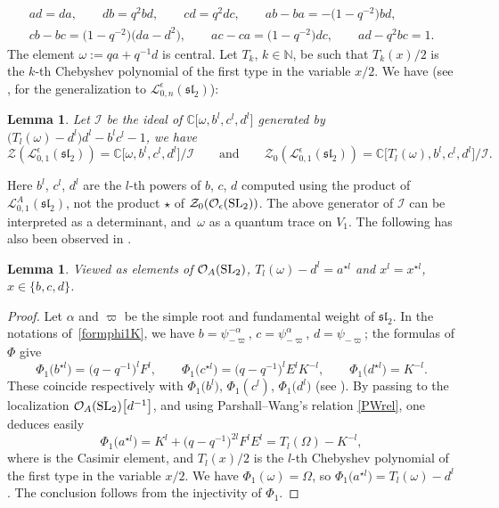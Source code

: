 \documentclass[pdftex]{sigma}
\numberwithin{equation}{section}
\newtheorem{lem}[teo]{Lemma}
\theoremstyle{definition}
\newcommand{\e}{\epsilon}
\newcommand{\mc}{\mathbb{C}}
\newcommand{\mn}{\mathbb{N}}
\newcommand{\Ll}{{\mathcal L}}
\newcommand{\Oo}{{\mathcal O}}
\begin{document}
\begin{gather}
ad=da ,\qquad db = q^2 bd, \qquad cd = q^2dc, \qquad
 ab-ba = -\big(1-q^{-2}\big)bd,\nonumber \\ cb-bc = \big(1-q^{-2}\big)\big(da-d^2\big),\qquad ac-ca=\big(1-q^{-2}\big)dc,\qquad ad-q^2bc=1. \label{rel01}
\end{gather}
The element $\omega:=qa+q^{-1}d$ is central. Let $T_k$, $k\in \mn$, be such that $T_k(x)/2$ is the $k$-th Chebyshev polynomial of the first type in the variable $x/2$. We have (see \cite[Proposition 7.2]{BR}, for the generalization to $\Ll_{0,n}^\e({\mathfrak{sl}_2})$):
\begin{lem}\label{L01sl2} Let $\mathcal{I}$ be the ideal of $\mc\big[\omega,b^l,c^l,d^l\big]$ generated by $\big(T_l(\omega)-d^l\big)d^l-b^lc^l-1$, we have
\[
\mathcal{Z}(\Ll_{0,1}^\e({\mathfrak{sl}_2})) = \mc\big[\omega,b^l,c^l,d^l\big]/\mathcal{I}\qquad \text{and} \qquad \mathcal{Z}_0(\Ll_{0,1}^\e({\mathfrak{sl}_2})) = \mc\big[T_l(\omega),b^l,c^l,d^l\big]/\mathcal{I}.
\]
\end{lem}
Here $b^l$, $c^l$, $d^l$ are the $l$-th powers of $b$, $c$, $d$ computed using the product of $\Ll_{0,1}^A({\mathfrak{sl}_2})$, not the product $\star$ of $\mathcal{Z}_0(\Oo_\e({\rm SL}_2))$. The above generator of $\mathcal{I}$ can be interpreted as a determinant, and~$\omega$ as a quantum trace on $V_1$. The following has also been observed in \cite{KQ}.

\begin{lem}\label{identZF} Viewed as elements of $\Oo_A({\rm SL}_2)$, $T_l(\omega)-d^l = a^{\star l}$ and $x^l = x^{\star l}$, $x\in \{b,c,d\}$.
\end{lem}
\begin{proof} Let $\alpha$ and $\varpi$ be the simple root and fundamental weight of ${\mathfrak{sl}_2}$. In the notations of~\eqref{formphi1K}, we have $b = \psi^{-\alpha}_{-\varpi}$, $c=\psi^\alpha_{-\varpi}$, $d=\psi_{-\varpi}$; the formulas of $\Phi$ give
\[
\Phi_1\big(b^{\star l}\big) = \big(q-q^{-1}\big)^lF^l , \qquad \Phi_1\big(c^{\star l}\big) = \big(q-q^{-1}\big)^lE^lK^{-l},
\qquad \Phi_1\big(d^{\star l}\big) = K^{-l}.
\]
 These coincide respectively with $\Phi_1\big(b^{l}\big)$, $\Phi_1(c^{l})$, $\Phi_1\big(d^{l}\big)$ (see \cite[equation~(5.3)]{BR}). By passing to the localization $\Oo_A({\rm SL}_2)\big[d^{-1}\big]$, and using Par\-shall--Wang's relation \eqref{PWrel}, one deduces easily
\[
\Phi_1\big(a^{\star l}\big) = K^l + \big(q-q^{-1}\big)^{2l}F^lE^l = T_l(\Omega)-K^{-l},
\]
 where \smash{$\Omega=\big(\e-\e^{-1}\big)^2FE+\e K+\e^{-1}K^{-1}$} is the Casimir element, and $T_l(x)/2$ is the $l$-th Chebyshev polynomial of the first type in the variable $x/2$. We have $\Phi_1(\omega) = \Omega$, so $\Phi_1\big(a^{\star l}\big) = T_l(\omega)-d^l$. The conclusion follows from the injectivity of $\Phi_1$.
\end{proof}
\end{document}
